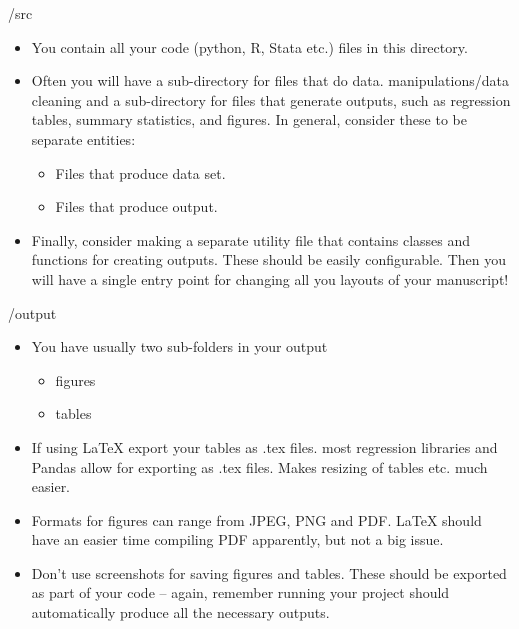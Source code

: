 \documentclass{beamer}
\begin{document}
\begin{frame}{/src}
    \begin{itemize}
        \item You contain all your code (python, R, Stata etc.) files in this directory.
        \item Often you will have a sub-directory for files that do data. manipulations/data cleaning and a sub-directory for files that generate outputs, such as regression tables, summary statistics, and figures. In general, consider these to be separate entities:
        \begin{itemize}
            \item Files that produce data set.
            \item Files that produce output.
        \end{itemize}
        \item Finally, consider making a separate utility file that contains classes and functions for creating outputs. These should be easily configurable. Then you will have a single entry point for changing all you layouts of your manuscript!  
    \end{itemize}
\end{frame}

\begin{frame}{/output}
    \begin{itemize}
        \item You have usually two sub-folders in your output
        \begin{itemize}
            \item figures
            \item tables
        \end{itemize}
        \item If using LaTeX export your tables as .tex files. most regression libraries and Pandas allow for exporting as .tex files. Makes resizing of tables etc. much easier.
        \item Formats for figures can range from JPEG, PNG and PDF. LaTeX should have an easier time compiling PDF apparently, but not a big issue.
        \item Don't use screenshots for saving figures and tables. These should be exported as part of your code – again, remember running your project should automatically produce all the necessary outputs.
    \end{itemize}
\end{frame}
\end{document}
